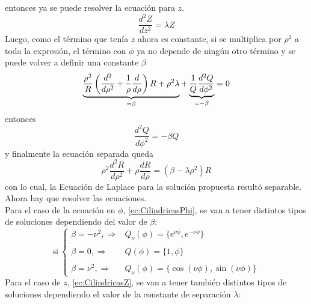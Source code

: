 entonces ya se puede resolver la ecuación para $z$.
\begin{equation}
    \frac{d^{2}Z}{dz^{2}} = \lambda Z
        \label{ec:CilindricasZ}
\end{equation}
Luego, como el término que tenía $z$ ahora es constante, si se multiplica por $\rho^{2}$ a toda la expresión, el término con $\phi$ ya no depende de ningún otro término y se puede volver a definir una constante $\beta$
\begin{equation*}
    \underbrace%
    {%
        \frac{\rho^{2}}{R}
        \left(
            \frac{d^{2}}{d\rho^{2}} 
            + \frac{1}{\rho}\frac{d}{d\rho}
        \right)R
        +
        \rho^{2}\lambda
    }_{= \beta}
    +
    \underbrace%
    {%
        \frac{1}{Q}\frac{d^{2}Q}{d\phi^{2}}
    }_{= -\beta}
    = 0
\end{equation*}
entonces
\begin{equation}
    \frac{d^{2}Q}{d\phi^{2}} = -\beta Q
        \label{ec:CilindricasPhi}
\end{equation}
y finalmente la ecuación separada queda
\begin{equation}
    \rho^{2}\frac{d^{2}R}{d\rho^{2}} + \rho\frac{dR}{d\rho}
    =
    \left(
        \beta - \lambda\rho^{2}
    \right)R
        \label{ec:CilindriciasRho}
\end{equation}
con lo cual, la Ecuación de Laplace para la solución propuesta resultó separable. Ahora hay que resolver las ecuaciones.\\
\indent Para el caso de la ecuación en $\phi$, \eqref{ec:CilindricasPhi}, se van a tener distintos tipos de soluciones dependiendo del valor de $\beta$:
\begin{equation*}
    \mbox{si}\ \left\{
        \begin{matrix}
            \beta = -\nu^{2}, \Longrightarrow 
            &Q_{\nu}(\phi) = \{e^{\nu\phi}, e^{-\nu\phi} \}\\
            &\\
            \beta = 0, \Longrightarrow 
            &Q(\phi) = \{1, \phi\}\\
            &\\
            \beta = \nu^{2}, \Longrightarrow
            &Q_{\nu}(\phi) = \{\cos{(\nu \phi)}, \sin{(\nu\phi)} \}
        \end{matrix}
    \right.
\end{equation*}
Para el caso de $z$, \eqref{ec:CilindricasZ}, se van a tener también distintos tipos de soluciones dependiendo el valor de la constante de separación $\lambda$:
